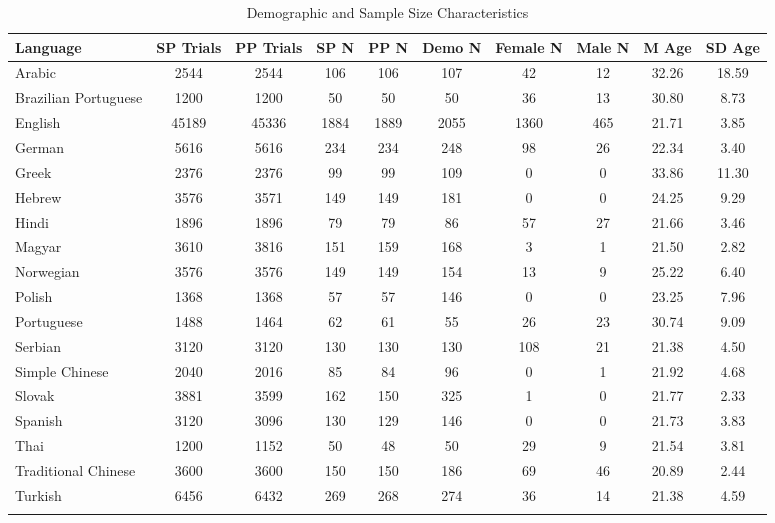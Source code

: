 \documentclass[
  man]{apa7}
\begin{document}
\begin{table}[tbp]

\begin{center}
\begin{threeparttable}

\caption{\label{tab:sample-table}Demographic and Sample Size Characteristics}

\footnotesize{

\begin{tabular}{lccccccccc}
\toprule
Language & SP 
Trials & PP 
Trials & SP 
N & PP 
N & Demo 
N & Female 
N & Male 
N & M 
Age & SD 
Age\\
\midrule
Arabic & 2544 & 2544 & 106 & 106 & 107 & 42 & 12 & 32.26 & 18.59\\
Brazilian Portuguese & 1200 & 1200 & 50 & 50 & 50 & 36 & 13 & 30.80 & 8.73\\
English & 45189 & 45336 & 1884 & 1889 & 2055 & 1360 & 465 & 21.71 & 3.85\\
German & 5616 & 5616 & 234 & 234 & 248 & 98 & 26 & 22.34 & 3.40\\
Greek & 2376 & 2376 & 99 & 99 & 109 & 0 & 0 & 33.86 & 11.30\\
Hebrew & 3576 & 3571 & 149 & 149 & 181 & 0 & 0 & 24.25 & 9.29\\
Hindi & 1896 & 1896 & 79 & 79 & 86 & 57 & 27 & 21.66 & 3.46\\
Magyar & 3610 & 3816 & 151 & 159 & 168 & 3 & 1 & 21.50 & 2.82\\
Norwegian & 3576 & 3576 & 149 & 149 & 154 & 13 & 9 & 25.22 & 6.40\\
Polish & 1368 & 1368 & 57 & 57 & 146 & 0 & 0 & 23.25 & 7.96\\
Portuguese & 1488 & 1464 & 62 & 61 & 55 & 26 & 23 & 30.74 & 9.09\\
Serbian & 3120 & 3120 & 130 & 130 & 130 & 108 & 21 & 21.38 & 4.50\\
Simple Chinese & 2040 & 2016 & 85 & 84 & 96 & 0 & 1 & 21.92 & 4.68\\
Slovak & 3881 & 3599 & 162 & 150 & 325 & 1 & 0 & 21.77 & 2.33\\
Spanish & 3120 & 3096 & 130 & 129 & 146 & 0 & 0 & 21.73 & 3.83\\
Thai & 1200 & 1152 & 50 & 48 & 50 & 29 & 9 & 21.54 & 3.81\\
Traditional Chinese & 3600 & 3600 & 150 & 150 & 186 & 69 & 46 & 20.89 & 2.44\\
Turkish & 6456 & 6432 & 269 & 268 & 274 & 36 & 14 & 21.38 & 4.59\\
\bottomrule
\addlinespace
\end{tabular}

}
\end{threeparttable}
\end{center}
\end{table}
\end{document}
